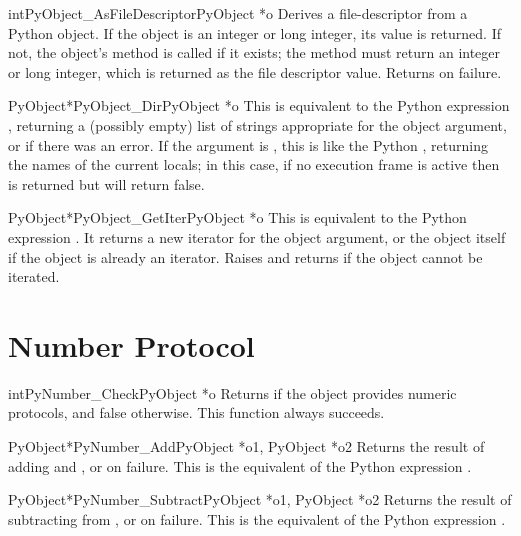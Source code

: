 \begin{cfuncdesc}{int}{PyObject_AsFileDescriptor}{PyObject *o}
  Derives a file-descriptor from a Python object.  If the object is an
  integer or long integer, its value is returned.  If not, the
  object's  method is called if it exists; the method
  must return an integer or long integer, which is returned as the
  file descriptor value.  Returns  on failure.
\end{cfuncdesc}

\begin{cfuncdesc}{PyObject*}{PyObject_Dir}{PyObject *o}
  This is equivalent to the Python expression ,
  returning a (possibly empty) list of strings appropriate for the
  object argument, or \NULL{} if there was an error.  If the argument
  is \NULL, this is like the Python , returning the names
  of the current locals; in this case, if no execution frame is active
  then \NULL{} is returned but  will
  return false.
\end{cfuncdesc}

\begin{cfuncdesc}{PyObject*}{PyObject_GetIter}{PyObject *o}
  This is equivalent to the Python expression .
  It returns a new iterator for the object argument, or the object 
  itself if the object is already an iterator.  Raises
   and returns \NULL{} if the object cannot be
  iterated.
\end{cfuncdesc}


\section{Number Protocol \label{number}}

\begin{cfuncdesc}{int}{PyNumber_Check}{PyObject *o}
  Returns  if the object  provides numeric protocols,
  and false otherwise.  This function always succeeds.
\end{cfuncdesc}


\begin{cfuncdesc}{PyObject*}{PyNumber_Add}{PyObject *o1, PyObject *o2}
  Returns the result of adding  and , or \NULL{} on
  failure.  This is the equivalent of the Python expression
  .
\end{cfuncdesc}


\begin{cfuncdesc}{PyObject*}{PyNumber_Subtract}{PyObject *o1, PyObject *o2}
  Returns the result of subtracting  from , or \NULL{}
  on failure.  This is the equivalent of the Python expression
  .
\end{cfuncdesc}


